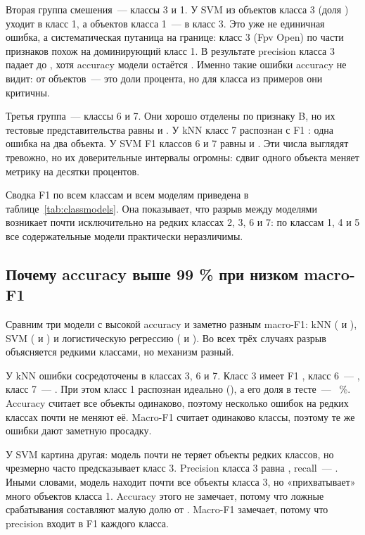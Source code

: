 \documentclass[14pt,a4paper]{extarticle}
\begin{document}
Вторая группа смешения~--- классы 3 и 1. У SVM
\ConfCntSvmThreeOne{} из \SupportClassThree{} объектов класса 3
(доля \ConfSvmThreeOne) уходит в класс 1, а \ConfCntSvmOneThree{} объектов
класса 1~--- в класс 3. Это уже не единичная ошибка, а систематическая
путаница на границе: класс 3 (Fpv Open) по части признаков похож на
доминирующий класс 1. В результате precision класса 3 падает до
\PrecSvmClassThree, хотя accuracy модели остаётся \AccSvm. Именно такие
ошибки accuracy не видит: \ConfCntSvmOneThree{} от \SupportClassOne{}
объектов~--- это доли процента, но для класса из
\SupportClassThree{} примеров они критичны.

Третья группа~--- классы 6 и 7. Они хорошо отделены по признаку B,
но их тестовые представительства равны \SupportClassSix{} и
\SupportClassSeven. У kNN класс 7 распознан с F1 \FOneKnnClassSeven:
одна ошибка на два объекта. У SVM F1 классов 6 и 7 равны
\FOneSvmClassSix{} и \FOneSvmClassSeven. Эти числа выглядят тревожно,
но их доверительные интервалы огромны: сдвиг одного объекта меняет
метрику на десятки процентов.

Сводка F1 по всем классам и всем моделям приведена в
таблице~\ref{tab:classmodels}. Она показывает, что разрыв между
моделями возникает почти исключительно на редких классах 2, 3, 6 и 7:
по классам 1, 4 и 5 все содержательные модели практически неразличимы.



\subsection{Почему accuracy выше 99 \% при низком macro-F1}

Сравним три модели с высокой accuracy и заметно разным macro-F1:
kNN (\AccKnn{} и \FOneKnn), SVM (\AccSvm{} и \FOneSvm) и логистическую
регрессию (\AccLogreg{} и \FOneLogreg). Во всех трёх случаях разрыв
объясняется редкими классами, но механизм разный.

У kNN ошибки сосредоточены в классах 3, 6 и 7. Класс 3 имеет F1
\FOneKnnClassThree, класс 6~--- \FOneKnnClassSix, класс 7~---
\FOneKnnClassSeven. При этом класс 1 распознан идеально
(\FOneKnnClassOne), а его доля в тесте~--- \ShareMajorTest~\%.
Accuracy считает все объекты одинаково, поэтому несколько ошибок
на редких классах почти не меняют её. Macro-F1 считает одинаково
классы, поэтому те же ошибки дают заметную просадку.

У SVM картина другая: модель почти не теряет объекты редких классов,
но чрезмерно часто предсказывает класс 3. Precision класса 3 равна
\PrecSvmClassThree, recall~--- \RecSvmClassThree. Иными словами, модель
находит почти все объекты класса 3, но «прихватывает» много объектов
класса 1. Accuracy этого не замечает, потому что ложные срабатывания
составляют малую долю от \SupportClassOne. Macro-F1 замечает, потому что
precision входит в F1 каждого класса.
\end{document}
